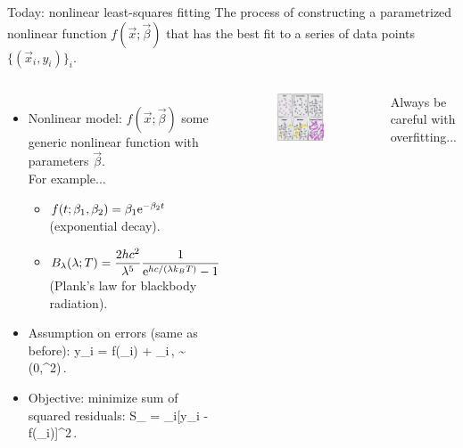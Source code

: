 \documentclass[10pt,aspectratio=169,handout]{beamer}
\begin{document}
\begin{frame}{Today: {\color{red} nonlinear} least-squares fitting}
	The process of constructing a parametrized {\color{red}nonlinear} function $f(\vec{x}; \vec{\beta})$ that has the best fit to a series of data points $\{(\vec{x}_i,y_i)\}_i$. \pause
	\begin{columns}
			\begin{itemize}[<+->]
				\item {\color{red} Nonlinear} model: $f(\vec{x}; \vec{\beta})$ some generic nonlinear function with parameters $\vec{\beta}$.\\
				For example...
				\vspace{0.1cm}
				\begin{itemize}
					\item $ f(t;\beta_1,\beta_2) = \beta_1{\rm {e}}^{-\beta_2 t} $ (exponential decay).
					\vspace{0.1cm}
					\item $ B_\lambda(\lambda; T) = \dfrac{2h c^2}{\lambda^5}\dfrac{1}{{\rm {e}}^{hc/(\lambda k_BT)}-1} $ (Plank's law for blackbody radiation).
				\end{itemize}
				\item Assumption on errors (same as before): \bea
				y_i = f(_i) + \varepsilon_i\,,\quad
				\varepsilon\sim\ncal(0,\sigma^2)\,.\eea
				 \item Objective: minimize sum of squared residuals:
				 \bea
				 	S_{} = \sum_i[y_i - f(_i)]^2\,.
				\eea
			\end{itemize}
		\vspace{-0.2cm}
		\begin{figure}
			\centering
			\includegraphics[width=0.8\textwidth]{fig/overfit}
		\end{figure}%
	\begin{center}
		\vspace{-0.2cm}
	Always be careful with overfitting...
	\end{center}

	\end{columns}
\end{frame}
\end{document}
